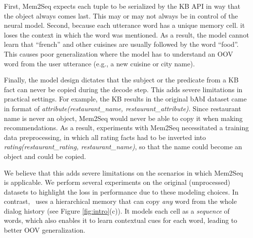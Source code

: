 First, Mem2Seq expects each tuple to be serialized by the KB API in way that the object always comes last. This may or may not always be in control of the neural model. Second, because each utterance word has a unique memory cell. it loses the context in which the word was mentioned. As a result, the model cannot learn that ``french'' and other cuisines are usually followed by the word ``food''. This causes poor generalization where the model has to understand an OOV word from the user utterance (e.g., a new cuisine or city name). 

Finally, the model design dictates that the subject or the predicate from a KB fact can never be copied during the decode step. This adds severe limitations in practical settings. For example, the KB results in the original bAbI dataset \cite{BordesW16} came in format of {\em attribute(restaurant\_name, restaurant\_attribute)}. Since restaurant name is never an object, Mem2Seq would never be able to copy it when making recommendations. As a result, experiments with Mem2Seq necessitated a training data preprocessing, in which all rating facts had to be inverted into {\em rating(restaurant\_rating, restaurant\_name)}, so that the name could become an object and could be copied. 

We believe that this adds severe limitations on the scenarios in which Mem2Seq is applicable. We perform several experiments on the original (unprocessed) datasets to highlight the loss in performance due to these modeling choices. 
In contrast, \sys\ uses a hierarchical memory that can copy {\em any} word from the whole dialog history (see Figure \ref{fig:intro}(c)). It models each cell as a {\em sequence} of words, which also enables it to learn contextual cues for each word, leading to better OOV generalization. 



